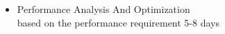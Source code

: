 \documentclass{./template/sig-alternate-10pt-tight}
\begin{document}
\begin{sloppypar}
\begin{itemize}
\item Performance Analysis And Optimization\\
	based on the performance requirement 5-8 days
\end{itemize}
\newpage
\balance

%
%
%



\end{sloppypar}
\end{document}
